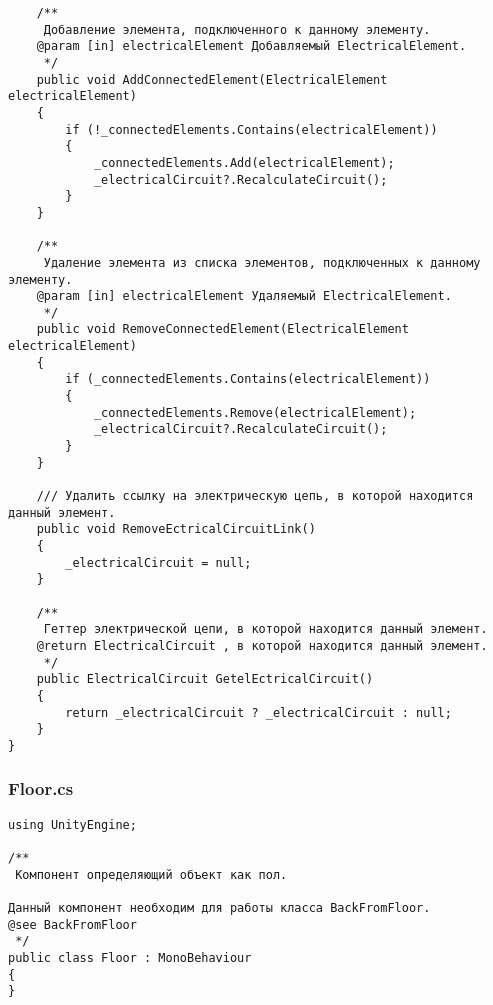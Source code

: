 \begin{verbatim}
    /**
     Добавление элемента, подключенного к данному элементу.
    @param [in] electricalElement Добавляемый ElectricalElement.
     */
    public void AddConnectedElement(ElectricalElement electricalElement)
    {
        if (!_connectedElements.Contains(electricalElement))
        {
            _connectedElements.Add(electricalElement);
            _electricalCircuit?.RecalculateCircuit();
        }
    }

    /**
     Удаление элемента из списка элементов, подключенных к данному элементу.
    @param [in] electricalElement Удаляемый ElectricalElement.
     */
    public void RemoveConnectedElement(ElectricalElement electricalElement)
    {
        if (_connectedElements.Contains(electricalElement))
        {
            _connectedElements.Remove(electricalElement);
            _electricalCircuit?.RecalculateCircuit();
        }
    }

    /// Удалить ссылку на электрическую цепь, в которой находится данный элемент.
    public void RemoveEctricalCircuitLink()
    {
        _electricalCircuit = null;
    }

    /**
     Геттер электрической цепи, в которой находится данный элемент.
    @return ElectricalCircuit , в которой находится данный элемент.
     */
    public ElectricalCircuit GetelEctricalCircuit()
    {
        return _electricalCircuit ? _electricalCircuit : null;
    }
}

\end{verbatim}
\subsubsection*{Floor.cs}
\begin{verbatim}
﻿using UnityEngine;

/**
 Компонент определяющий объект как пол.

Данный компонент необходим для работы класса BackFromFloor.
@see BackFromFloor
 */
public class Floor : MonoBehaviour
{
}

\end{verbatim}
